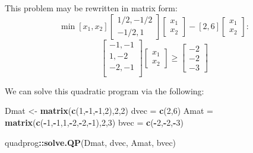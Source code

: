\documentclass[11pt,]{article}
\newenvironment{Shaded}{\begin{snugshade}}{\end{snugshade}}
\newcommand{\KeywordTok}[1]{\textcolor[rgb]{0.13,0.29,0.53}{\textbf{#1}}}
\newcommand{\DecValTok}[1]{\textcolor[rgb]{0.00,0.00,0.81}{#1}}
\newcommand{\StringTok}[1]{\textcolor[rgb]{0.31,0.60,0.02}{#1}}
\newcommand{\OperatorTok}[1]{\textcolor[rgb]{0.81,0.36,0.00}{\textbf{#1}}}
\newcommand{\NormalTok}[1]{#1}
\begin{document}
This problem may be rewritten in matrix form:
\[\min{} [x_1,x_2]\begin{bmatrix}1/2,-1/2\\-1/2,1\end{bmatrix}
\begin{bmatrix}x_1\\x_2\end{bmatrix}-[2,6]\begin{bmatrix}x_1\\x_2\end{bmatrix}:\]
\[\begin{bmatrix}
-1, -1\\
1, -2\\
-2, -1\\
\end{bmatrix}
\begin{bmatrix}
x_1\\
x_2
\end{bmatrix}\geq
\begin{bmatrix}
-2\\
-2\\
-3
\end{bmatrix}\]

We can solve this quadratic program via the following:

\begin{Shaded}
\begin{Highlighting}[]
\NormalTok{Dmat <-}\StringTok{ }\KeywordTok{matrix}\NormalTok{(}\KeywordTok{c}\NormalTok{(}\DecValTok{1}\NormalTok{,}\OperatorTok{-}\DecValTok{1}\NormalTok{,}\OperatorTok{-}\DecValTok{1}\NormalTok{,}\DecValTok{2}\NormalTok{),}\DecValTok{2}\NormalTok{,}\DecValTok{2}\NormalTok{)}
\NormalTok{dvec =}\StringTok{ }\KeywordTok{c}\NormalTok{(}\DecValTok{2}\NormalTok{,}\DecValTok{6}\NormalTok{)}
\NormalTok{Amat =}\StringTok{ }\KeywordTok{matrix}\NormalTok{(}\KeywordTok{c}\NormalTok{(}\OperatorTok{-}\DecValTok{1}\NormalTok{,}\OperatorTok{-}\DecValTok{1}\NormalTok{,}\DecValTok{1}\NormalTok{,}\OperatorTok{-}\DecValTok{2}\NormalTok{,}\OperatorTok{-}\DecValTok{2}\NormalTok{,}\OperatorTok{-}\DecValTok{1}\NormalTok{),}\DecValTok{2}\NormalTok{,}\DecValTok{3}\NormalTok{)}
\NormalTok{bvec =}\StringTok{ }\KeywordTok{c}\NormalTok{(}\OperatorTok{-}\DecValTok{2}\NormalTok{,}\OperatorTok{-}\DecValTok{2}\NormalTok{,}\OperatorTok{-}\DecValTok{3}\NormalTok{)}

\NormalTok{quadprog}\OperatorTok{::}\KeywordTok{solve.QP}\NormalTok{(Dmat, dvec, Amat, bvec)}
\end{Highlighting}
\end{Shaded}
\end{document}
